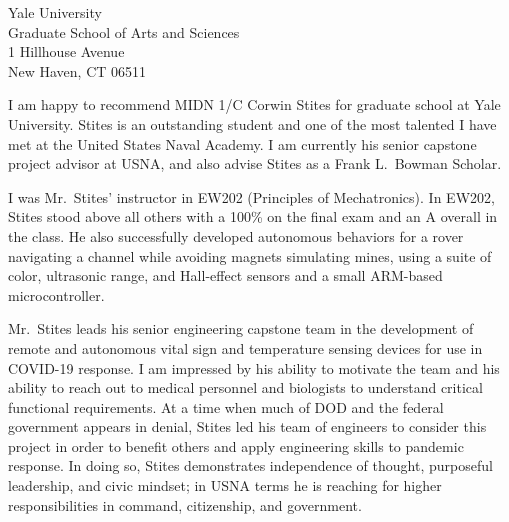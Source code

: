 \documentclass[10pt]{wrceletter}
\date{\today}
\begin{document}
\begin{letter}{%
Yale University\\
Graduate School of Arts and Sciences\\
1 Hillhouse Avenue\\
New Haven, CT 06511}

\opening{}
\raggedright %
\setlength{\parindent}{15pt} %
I am happy to recommend MIDN 1/C Corwin Stites for graduate school at Yale University.  Stites is an outstanding student and one of the most talented I have met at the United States Naval Academy. I am currently his senior capstone project advisor at USNA, and also advise Stites as a Frank L.~Bowman Scholar. 

I was Mr.~Stites' instructor in EW202 (Principles of Mechatronics).  In EW202, Stites stood above all others with a 100\% on the final exam and an A overall in the class. He also successfully developed autonomous behaviors for a rover navigating a channel while avoiding magnets simulating mines, using a suite of color, ultrasonic range, and Hall-effect sensors and a small ARM-based microcontroller. 

Mr.~Stites leads his senior engineering capstone team in the development of remote and autonomous vital sign and temperature sensing devices for use in COVID-19 response. I am impressed by his ability to motivate the team and his ability to reach out to medical personnel and biologists to understand critical functional requirements. At a time when much of DOD and the federal government appears in denial, Stites led his team of engineers to consider this project in order to benefit others and apply engineering skills to pandemic response. In doing so, Stites demonstrates independence of thought, purposeful leadership, and civic mindset; in USNA terms he is reaching for higher responsibilities in command, citizenship, and government.


\end{letter}
\end{document}
